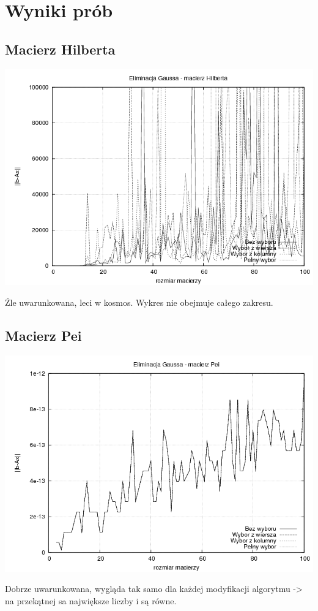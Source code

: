 \documentclass[a4paper,10pt]{article}
\begin{document}
\section{Wyniki prób}
    \subsection{Macierz Hilberta}
        \begin{center}
            \includegraphics[width=140mm]{hilbert_plot.png}
        \end{center}
        Źle uwarunkowana, leci w kosmos. Wykres nie obejmuje całego zakresu.
    \subsection{Macierz Pei}
        \begin{center}
            \includegraphics[width=140mm]{pei_plot.png}
        \end{center}
        Dobrze uwarunkowana, wygląda tak samo dla każdej modyfikacji algorytmu -> na przekątnej sa największe liczby i są równe.
\end{document}
